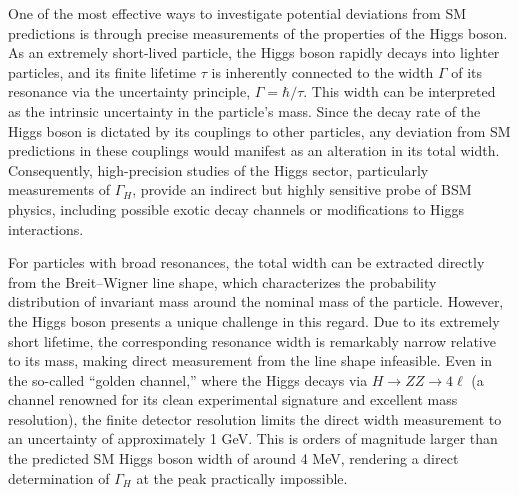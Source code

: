 
One of the most effective ways to investigate potential deviations from SM predictions is through precise measurements of the properties of the Higgs boson. As an extremely short-lived particle, the Higgs boson rapidly decays into lighter particles, and its finite lifetime \( \tau \) is inherently connected to the width \( \Gamma \) of its resonance via the uncertainty principle, \( \Gamma = \hbar / \tau \). This width can be interpreted as the intrinsic uncertainty in the particle's mass. Since the decay rate of the Higgs boson is dictated by its couplings to other particles, any deviation from SM predictions in these couplings would manifest as an alteration in its total width. Consequently, high-precision studies of the Higgs sector, particularly measurements of \( \Gamma_H \), provide an indirect but highly sensitive probe of BSM physics, including possible exotic decay channels or modifications to Higgs interactions.

For particles with broad resonances, the total width can be extracted directly from the Breit–Wigner line shape, which characterizes the probability distribution of invariant mass around the nominal mass of the particle. However, the Higgs boson presents a unique challenge in this regard. Due to its extremely short lifetime, the corresponding resonance width is remarkably narrow relative to its mass, making direct measurement from the line shape infeasible. Even in the so-called ``golden channel,'' where the Higgs decays via \( H \to ZZ \to 4\ell \) (a channel renowned for its clean experimental signature and excellent mass resolution), the finite detector resolution limits the direct width measurement to an uncertainty of approximately 1 GeV. This is orders of magnitude larger than the predicted SM Higgs boson width of around 4 MeV, rendering a direct determination of \( \Gamma_H \) at the peak practically impossible.

